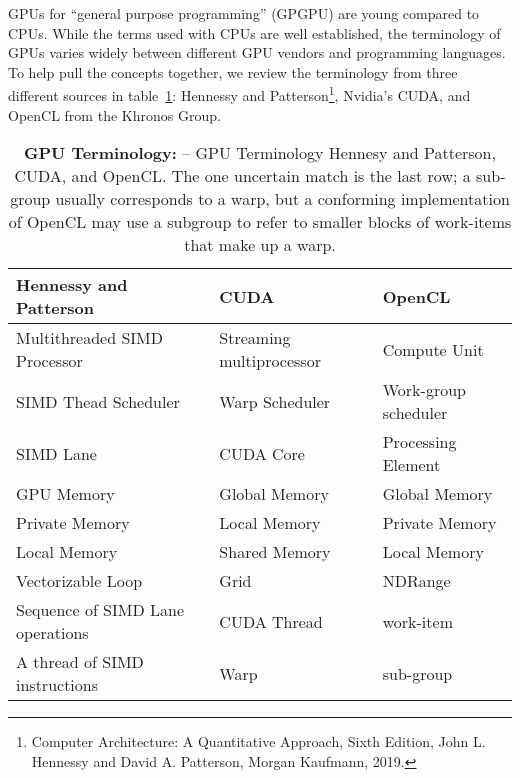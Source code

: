 GPUs for ``general purpose programming'' (GPGPU) are young compared to CPUs.  
While the terms used with CPUs are well established,
the terminology of GPUs varies widely between different GPU vendors and programming
languages.  To help pull the concepts together, we review the terminology from three
different sources in table~\ref{table:GPUjargon}: Hennessy and 
Patterson\footnote{Computer Architecture: A Quantitative Approach, Sixth Edition, 
John L. Hennessy and David A. Patterson, Morgan Kaufmann, 2019.}, Nvidia's CUDA, 
and OpenCL from the Khronos Group.

\begin{table}[!htbp]
\centering
\caption{\textbf{GPU Terminology: } 
-- \small
GPU Terminology Hennesy and Patterson, CUDA, and 
OpenCL.   The one uncertain match is the last row;
a sub-group usually corresponds to a warp, but a conforming implementation of OpenCL 
may use a subgroup to refer to smaller blocks of work-items that make up a warp.}
\label{table:GPUjargon}
\begin{tabular}{|l|l|l|}
\hline
\textbf{Hennessy and Patterson}  & \textbf{CUDA} & \textbf{OpenCL} \\
\hline
Multithreaded SIMD Processor    & Streaming multiprocessor & Compute Unit \\
\hline
SIMD Thead Scheduler               & Warp Scheduler                 & Work-group scheduler \\
\hline
SIMD Lane                                  & CUDA Core                        & Processing Element \\
\hline
GPU Memory                              & Global Memory                   & Global Memory \\
\hline
Private Memory                          & Local Memory                     & Private Memory \\
\hline
Local Memory                            & Shared Memory                   & Local Memory \\
\hline
Vectorizable Loop                       & Grid                                     & NDRange \\
\hline
Sequence of SIMD Lane operations & CUDA Thread                & work-item \\
\hline
A thread of SIMD instructions            & Warp                              & sub-group \\
\hline
\end{tabular}
\end{table}








